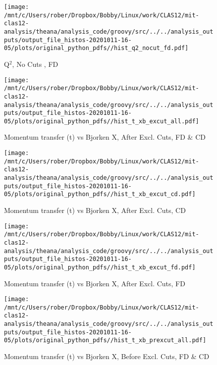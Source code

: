 \documentclass{article}
\begin{document}
\begin{landscape}
    \begin{figure}[h]
        \centering

        \texttt{[image: /mnt/c/Users/rober/Dropbox/Bobby/Linux/work/CLAS12/mit-clas12-analysis/theana/analysis\_code/groovy/src/../../analysis\_outputs/output\_file\_histos-20201011-16-05/plots/original\_python\_pdfs//hist\_q2\_nocut\_fd.pdf]}
        \captionsetup{textformat=empty,labelformat=blank}
        \caption{Q$^{2}$, No Cuts , FD}
    \end{figure}
    \clearpage
    
    \begin{figure}[h]
        \centering

        \texttt{[image: /mnt/c/Users/rober/Dropbox/Bobby/Linux/work/CLAS12/mit-clas12-analysis/theana/analysis\_code/groovy/src/../../analysis\_outputs/output\_file\_histos-20201011-16-05/plots/original\_python\_pdfs//hist\_t\_xb\_excut\_all.pdf]}
        \captionsetup{textformat=empty,labelformat=blank}
        \caption{Momentum transfer (t) vs Bjorken X, After Excl. Cuts, FD \& CD}
    \end{figure}
    \clearpage
    
    \begin{figure}[h]
        \centering

        \texttt{[image: /mnt/c/Users/rober/Dropbox/Bobby/Linux/work/CLAS12/mit-clas12-analysis/theana/analysis\_code/groovy/src/../../analysis\_outputs/output\_file\_histos-20201011-16-05/plots/original\_python\_pdfs//hist\_t\_xb\_excut\_cd.pdf]}
        \captionsetup{textformat=empty,labelformat=blank}
        \caption{Momentum transfer (t) vs Bjorken X, After Excl. Cuts, CD}
    \end{figure}
    \clearpage
    
    \begin{figure}[h]
        \centering

        \texttt{[image: /mnt/c/Users/rober/Dropbox/Bobby/Linux/work/CLAS12/mit-clas12-analysis/theana/analysis\_code/groovy/src/../../analysis\_outputs/output\_file\_histos-20201011-16-05/plots/original\_python\_pdfs//hist\_t\_xb\_excut\_fd.pdf]}
        \captionsetup{textformat=empty,labelformat=blank}
        \caption{Momentum transfer (t) vs Bjorken X, After Excl. Cuts, FD}
    \end{figure}
    \clearpage
    
    \begin{figure}[h]
        \centering

        \texttt{[image: /mnt/c/Users/rober/Dropbox/Bobby/Linux/work/CLAS12/mit-clas12-analysis/theana/analysis\_code/groovy/src/../../analysis\_outputs/output\_file\_histos-20201011-16-05/plots/original\_python\_pdfs//hist\_t\_xb\_prexcut\_all.pdf]}
        \captionsetup{textformat=empty,labelformat=blank}
        \caption{Momentum transfer (t) vs Bjorken X, Before Excl. Cuts, FD \& CD}
    \end{figure}
    \clearpage
    

\end{landscape}
\end{document}

